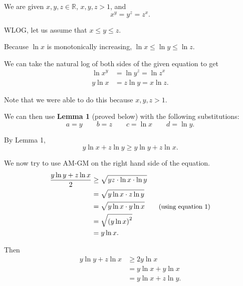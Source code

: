\documentclass[12pt]{article}
\begin{document}
\begin{solution}{2}

    We are given $x,y,z\in\mathbb R$, $x,y,z > 1$, and
    \begin{equation*}
        x^y=y^z=z^x.
    \end{equation*}
    
    WLOG, let us assume that $x \le y \le z$.
    
    Because $\ln x$ is monotonically increasing, $\ln x \le \ln y \le \ln z$.
    
    We can take the natural log of both sides of the given equation to get
    \begin{align*}
        \ln x^y &= \ln y^z = \ln z^x \\
        y\ln x &= z\ln y = x\ln z. \tag{1}
    \end{align*}
    
    Note that we were able to do this because $x, y, z > 1$.
    
    We can then use \textbf{Lemma 1} (proved below) with the following substitutions:
    \begin{equation*}
        a = y \qquad
        b = z \qquad
        c = \ln x \qquad
        d = \ln y.
    \end{equation*}
    
    By Lemma 1,
    \begin{equation*}
        y\ln x + z\ln y \ge y\ln y + z\ln x. \tag{2}
    \end{equation*}
    
    We now try to use AM-GM on the right hand side of the equation.
    \begin{align*}
        \frac{y\ln y + z\ln x}2
        &\ge \sqrt{yz\cdot\ln x\cdot\ln y} \\
        &= \sqrt{y\ln x\cdot z\ln y} \\
        &= \sqrt{y\ln x\cdot y\ln x} \qquad\small\text{(using equation 1)} \\
        &= \sqrt{\left(y\ln x\right)^2} \\
        &= y\ln x.
    \end{align*}
    
    Then
    \begin{align*}
        y\ln y + z\ln x
        &\ge 2y\ln x \\
        &= y\ln x + y\ln x \\
        &= y\ln x + z\ln y. \tag{3}
    \end{align*}
    

\end{solution}
\end{document}
